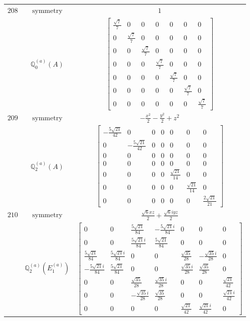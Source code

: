 \documentclass[fleqn,8pt,landscape]{jsarticle}
\begin{document}
\begin{longtable}{ccc}
$ 208 $ & $ \text{symmetry} $ & $ 1 $ \\
$  $ & $ \mathbb{Q}_{0}^{(a)}(A) $ & $ \begin{bmatrix} \frac{\sqrt{7}}{7} & 0 & 0 & 0 & 0 & 0 & 0 \\ 0 & \frac{\sqrt{7}}{7} & 0 & 0 & 0 & 0 & 0 \\ 0 & 0 & \frac{\sqrt{7}}{7} & 0 & 0 & 0 & 0 \\ 0 & 0 & 0 & \frac{\sqrt{7}}{7} & 0 & 0 & 0 \\ 0 & 0 & 0 & 0 & \frac{\sqrt{7}}{7} & 0 & 0 \\ 0 & 0 & 0 & 0 & 0 & \frac{\sqrt{7}}{7} & 0 \\ 0 & 0 & 0 & 0 & 0 & 0 & \frac{\sqrt{7}}{7} \end{bmatrix} $ \\ \hline
$ 209 $ & $ \text{symmetry} $ & $ - \frac{x^{2}}{2} - \frac{y^{2}}{2} + z^{2} $ \\
$  $ & $ \mathbb{Q}_{2}^{(a)}(A) $ & $ \begin{bmatrix} - \frac{5 \sqrt{21}}{42} & 0 & 0 & 0 & 0 & 0 & 0 \\ 0 & - \frac{5 \sqrt{21}}{42} & 0 & 0 & 0 & 0 & 0 \\ 0 & 0 & 0 & 0 & 0 & 0 & 0 \\ 0 & 0 & 0 & 0 & 0 & 0 & 0 \\ 0 & 0 & 0 & 0 & \frac{\sqrt{21}}{14} & 0 & 0 \\ 0 & 0 & 0 & 0 & 0 & \frac{\sqrt{21}}{14} & 0 \\ 0 & 0 & 0 & 0 & 0 & 0 & \frac{2 \sqrt{21}}{21} \end{bmatrix} $ \\ \hline
$ 210 $ & $ \text{symmetry} $ & $ \frac{\sqrt{6} x z}{2} + \frac{\sqrt{6} i y z}{2} $ \\
$  $ & $ \mathbb{Q}_{2}^{(a)}(E_{1}^{(a)}) $ & $ \begin{bmatrix} 0 & 0 & \frac{5 \sqrt{21}}{84} & - \frac{5 \sqrt{21} i}{84} & 0 & 0 & 0 \\ 0 & 0 & \frac{5 \sqrt{21} i}{84} & \frac{5 \sqrt{21}}{84} & 0 & 0 & 0 \\ \frac{5 \sqrt{21}}{84} & \frac{5 \sqrt{21} i}{84} & 0 & 0 & \frac{\sqrt{35}}{28} & - \frac{\sqrt{35} i}{28} & 0 \\ - \frac{5 \sqrt{21} i}{84} & \frac{5 \sqrt{21}}{84} & 0 & 0 & \frac{\sqrt{35} i}{28} & \frac{\sqrt{35}}{28} & 0 \\ 0 & 0 & \frac{\sqrt{35}}{28} & \frac{\sqrt{35} i}{28} & 0 & 0 & \frac{\sqrt{21}}{42} \\ 0 & 0 & - \frac{\sqrt{35} i}{28} & \frac{\sqrt{35}}{28} & 0 & 0 & \frac{\sqrt{21} i}{42} \\ 0 & 0 & 0 & 0 & \frac{\sqrt{21}}{42} & \frac{\sqrt{21} i}{42} & 0 \end{bmatrix} $ \\ \hline

\end{longtable}
\end{document}
